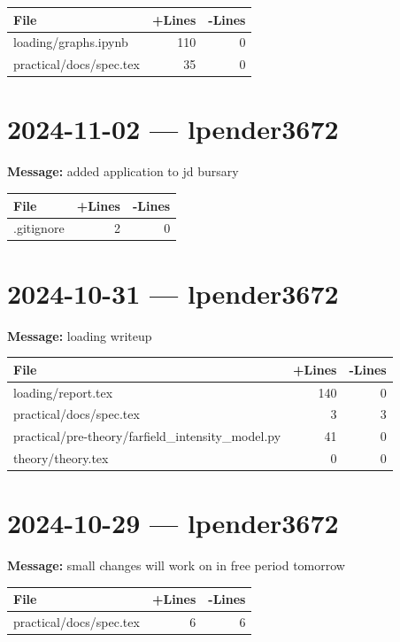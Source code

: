 \documentclass{article}
\begin{document}
\begin{longtable}{|p{10cm}|r|r|}
\hline \textbf{File} & \textbf{+Lines} & \textbf{-Lines} \\
\hline
loading/graphs.ipynb & 110 & 0 \\
\hline
practical/docs/spec.tex & 35 & 0 \\
\hline
\end{longtable}

\section*{2024-11-02 --- lpender3672}
\textbf{Message:} added application to jd bursary

\begin{longtable}{|p{10cm}|r|r|}
\hline \textbf{File} & \textbf{+Lines} & \textbf{-Lines} \\
\hline
.gitignore & 2 & 0 \\
\hline
\end{longtable}

\section*{2024-10-31 --- lpender3672}
\textbf{Message:} loading writeup

\begin{longtable}{|p{10cm}|r|r|}
\hline \textbf{File} & \textbf{+Lines} & \textbf{-Lines} \\
\hline
loading/report.tex & 140 & 0 \\
\hline
practical/docs/spec.tex & 3 & 3 \\
\hline
practical/pre-theory/farfield\_intensity\_model.py & 41 & 0 \\
\hline
theory/theory.tex & 0 & 0 \\
\hline
\end{longtable}

\section*{2024-10-29 --- lpender3672}
\textbf{Message:} small changes will work on in free period tomorrow

\begin{longtable}{|p{10cm}|r|r|}
\hline \textbf{File} & \textbf{+Lines} & \textbf{-Lines} \\
\hline
practical/docs/spec.tex & 6 & 6 \\
\hline
\end{longtable}
\end{document}
